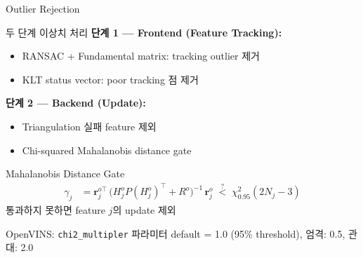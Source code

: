 \begin{frame}[shrink=10]{Outlier Rejection}
  \begin{block}{두 단계 이상치 처리}
    \textbf{단계 1 --- Frontend (Feature Tracking):}
    \begin{itemize}
      \item RANSAC + Fundamental matrix: tracking outlier 제거
      \item KLT status vector: poor tracking 점 제거
    \end{itemize}
    \textbf{단계 2 --- Backend (Update):}
    \begin{itemize}
      \item Triangulation 실패 feature 제외
      \item Chi-squared Mahalanobis distance gate
    \end{itemize}
  \end{block}
  \begin{block}{Mahalanobis Distance Gate}
    \begin{align*}
      \gamma_j &= \bm{r}_j^{o\top}\,\bigl(H_j^o P (H_j^o)^\top + R^o\bigr)^{-1}\,\bm{r}_j^o
      \;\overset{?}{<}\; \chi^2_{0.95}(2N_j - 3)
    \end{align*}
    통과하지 못하면 feature $j$의 update 제외
  \end{block}
  \begin{exampleblock}{OpenVINS: \texttt{chi2\_multipler} 파라미터}
    default = 1.0 (95\% threshold), 엄격: 0.5, 관대: 2.0
  \end{exampleblock}
\end{frame}


